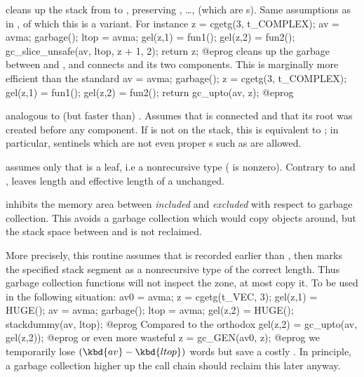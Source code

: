cleans up the stack from  to , preserving ,
\dots,  (which are s). Same assumptions as in
, of which this is a variant. For instance
\bprog
  z = cgetg(3, t_COMPLEX);
  av = avma; garbage(); ltop = avma;
  gel(z,1) = fun1();
  gel(z,2) = fun2();
  gc_slice_unsafe(av, ltop, z + 1, 2);
  return z;
@eprog\noindent
cleans up the garbage between  and , and connects 
and its two components. This is marginally more efficient than the standard
\bprog
  av = avma; garbage();
  z = cgetg(3, t_COMPLEX);
  gel(z,1) = fun1();
  gel(z,2) = fun2(); return gc_upto(av, z);
@eprog\noindent

 analogous to (but faster than)
. Assumes that  is connected and that its root was
created before any component. If  is not on the stack, this is
equivalent to ; in particular, sentinels which are not even
proper s such as  are allowed.

 assumes only that  is a leaf,
i.e a nonrecursive type ( is nonzero). Contrary
to  and ,  leaves length and
effective length of a  unchanged.


 inhibits the memory area
between  \emph{included} and  \emph{excluded} with respect to
garbage collection. This avoids a garbage collection which would copy objects
around, but the stack space between  and  is not reclaimed.

More precisely, this routine assumes that  is recorded earlier
than , then marks the specified stack segment as a
nonrecursive type of the correct length. Thus garbage collection functions
will not inspect the zone, at most copy it. To be used in the following
situation:
\bprog
  av0 = avma; z = cgetg(t_VEC, 3);
  gel(z,1) = HUGE(); av = avma; garbage(); ltop = avma;
  gel(z,2) = HUGE(); stackdummy(av, ltop);
@eprog\noindent
Compared to the orthodox
\bprog
  gel(z,2) = gc_upto(av, gel(z,2));
@eprog\noindent
or even more wasteful
\bprog
  z = gc_GEN(av0, z);
@eprog\noindent
we temporarily lose $(\kbd{av} - \kbd{ltop})$ words but save a costly
. In principle, a garbage collection higher up the call
chain should reclaim this later anyway.


